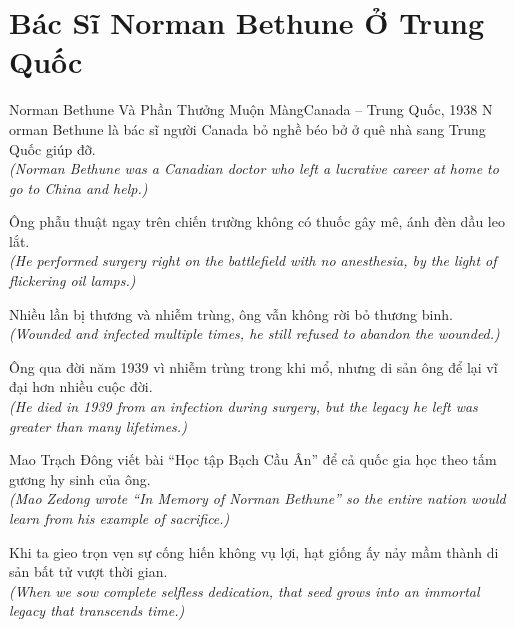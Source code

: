 \section{Bác Sĩ Norman Bethune Ở Trung Quốc}
\begin{truyen}{Norman Bethune Và Phần Thưởng Muộn Màng}{Canada -- Trung Quốc, 1938}
N orman Bethune là bác sĩ người Canada bỏ nghề béo bở ở quê nhà sang Trung Quốc giúp đỡ.\\
\textit{(Norman Bethune was a Canadian doctor who left a lucrative career at home to go to China and help.)}

Ông phẫu thuật ngay trên chiến trường không có thuốc gây mê, ánh đèn dầu leo lắt.\\
\textit{(He performed surgery right on the battlefield with no anesthesia, by the light of flickering oil lamps.)}

Nhiều lần bị thương và nhiễm trùng, ông vẫn không rời bỏ thương binh.\\
\textit{(Wounded and infected multiple times, he still refused to abandon the wounded.)}

Ông qua đời năm 1939 vì nhiễm trùng trong khi mổ, nhưng di sản ông để lại vĩ đại hơn nhiều cuộc đời.\\
\textit{(He died in 1939 from an infection during surgery, but the legacy he left was greater than many lifetimes.)}

Mao Trạch Đông viết bài ``Học tập Bạch Cầu Ân'' để cả quốc gia học theo tấm gương hy sinh của ông.\\
\textit{(Mao Zedong wrote ``In Memory of Norman Bethune'' so the entire nation would learn from his example of sacrifice.)}

\end{truyen}
\begin{baihoc}
  Khi ta gieo trọn vẹn sự cống hiến không vụ lợi, hạt giống ấy nảy mầm thành di sản bất tử vượt thời gian.\\
  \textit{(When we sow complete selfless dedication, that seed grows into an immortal legacy that transcends time.)}
\end{baihoc}
